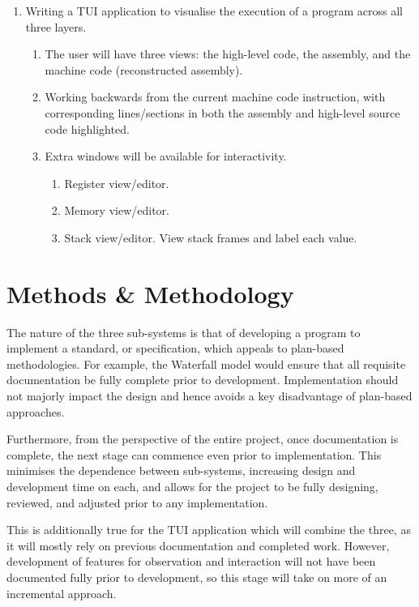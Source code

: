 \documentclass{article}
\begin{document}
\begin{enumerate}
        \item Writing a TUI application to visualise the execution of a program across all three layers.
        \begin{enumerate}
            \item The user will have three views: the high-level code, the assembly, and the machine code (reconstructed assembly).
            \item Working backwards from the current machine code instruction, with corresponding lines/sections in both the assembly and high-level source code highlighted.
            \item Extra windows will be available for interactivity.
            \begin{enumerate}
                \item Register view/editor.
                \item Memory view/editor.
                \item Stack view/editor.
                View stack frames and label each value.
            \end{enumerate}
        \end{enumerate}
    \end{enumerate}

    \section{Methods \& Methodology}\label{sec:methods-&-methodology}

    The nature of the three sub-systems is that of developing a program to implement a standard, or specification, which appeals to plan-based methodologies.
    For example, the Waterfall model would ensure that all requisite documentation be fully complete prior to development.
    Implementation should not majorly impact the design and hence avoids a key disadvantage of plan-based approaches.

    Furthermore, from the perspective of the entire project, once documentation is complete, the next stage can commence even prior to implementation.
    This minimises the dependence between sub-systems, increasing design and development time on each, and allows for the project to be fully designing, reviewed, and adjusted prior to any implementation.

    This is additionally true for the TUI application which will combine the three, as it will mostly rely on previous documentation and completed work.
    However, development of features for observation and interaction will not have been documented fully prior to development, so this stage will take on more of an incremental approach.
\end{document}
